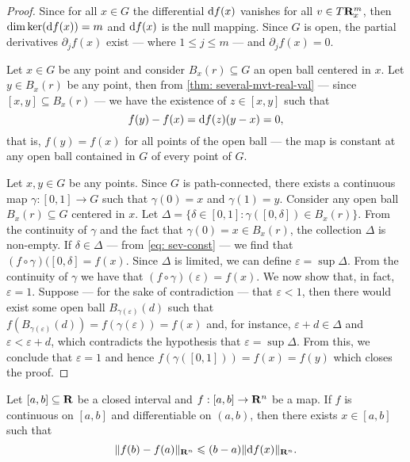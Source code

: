 \begin{proof}
  Since for all \(x \in G\) the differential \(\mathrm{d} f(x)\) vanishes for all \(v
  \in T\mathbf{R}^m_x\), then \(\dim \ker(\mathrm{d} f(x)) = m\) and \(\mathrm{d} f(x)\) is the
  null mapping. Since \(G\) is open, the partial derivatives \(\partial_j f(x)\)
  exist --- where \(1 \leq j \leq m\) --- and \(\partial_j f(x) = 0\).

  Let \(x \in G\) be any point and consider \(B_x(r) \subseteq G\) an open ball
  centered in \(x\). Let \(y \in B_x(r)\) be any point, then from \cref{thm:
  several-mvt-real-val} --- since \([x, y] \subseteq B_x(r)\) --- we have the
  existence of \(z \in [x, y]\) such that
  \begin{equation}\label{eq: sev-const}
    f(y) - f(x) = \mathrm{d} f(z)(y - x) = 0,
  \end{equation}
  that is, \(f(y) = f(x)\) for all points of the open ball --- the map is
  constant at any open ball contained in \(G\) of every point of \(G\).

  Let \(x, y \in G\) be any points. Since \(G\) is path-connected, there exists
  a continuous map \(\gamma: [0, 1] \to G\) such that \(\gamma(0) = x\) and
  \(\gamma(1) = y\). Consider any open ball \(B_x(r) \subseteq G\) centered in
  \(x\). Let \(\Delta = \{\delta \in [0, 1] \colon \gamma([0, \delta]) \in
  B_x(r)\}\). From the continuity of \(\gamma\) and the fact that \(\gamma(0) =
  x \in B_x(r)\), the collection \(\Delta\) is non-empty. If \(\delta \in
  \Delta\) --- from \cref{eq: sev-const} --- we find that \((f \circ \gamma)([0,
  \delta] = f(x)\). Since \(\Delta\) is limited, we can define \(\varepsilon =
  \sup \Delta\). From the continuity of \(\gamma\) we have that \((f \circ
  \gamma)(\varepsilon) = f(x)\). We now show that, in fact, \(\varepsilon = 1\).
  Suppose --- for the sake of contradiction --- that \(\varepsilon < 1\), then
  there would exist some open ball \(B_{\gamma(\varepsilon)}(d)\) such that
  \(f(B_{\gamma(\varepsilon)}(d)) = f(\gamma(\varepsilon)) = f(x)\) and, for
  instance, \(\varepsilon + d \in \Delta\) and \(\varepsilon < \varepsilon +
  d\), which contradicts the hypothesis that \(\varepsilon = \sup \Delta\). From
  this, we conclude that \(\varepsilon = 1\) and hence \(f(\gamma([0, 1])) = f(x)
  = f(y)\) which closes the proof.
\end{proof}

\begin{lemma}\label{lem: mvt-sev-real-dom}
  Let \([a, b] \subseteq \mathbf{R}\) be a closed interval and \(f: [a, b] \to \mathbf{R}^n\) be
  a map. If \(f\) is continuous on \([a, b]\) and differentiable on \((a, b)\),
  then there exists \(x \in [a, b]\) such that
  \[
    \lVert f(b) - f(a)\rVert_{\mathbf{R}^n} \leqslant (b - a) \lVert\mathrm{d} f(x)\rVert_{\mathbf{R}^n}.
  \]
\end{lemma}

